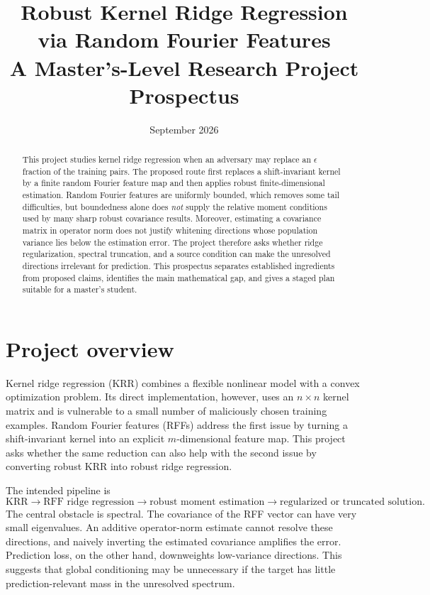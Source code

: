 \documentclass[11pt]{article}
\title{Robust Kernel Ridge Regression via Random Fourier Features\\
\large A Master's-Level Research Project Prospectus}
\author{}
\date{September 2026}
\begin{document}
\maketitle

\begin{abstract}
This project studies kernel ridge regression when an adversary may replace an
$\epsilon$ fraction of the training pairs.  The proposed route first replaces a
shift-invariant kernel by a finite random Fourier feature map and then applies
robust finite-dimensional estimation.  Random Fourier features are uniformly
bounded, which removes some tail difficulties, but boundedness alone does
\emph{not} supply the relative moment conditions used by many sharp robust
covariance results.  Moreover, estimating a covariance matrix in operator norm
does not justify whitening directions whose population variance lies below the
estimation error.  The project therefore asks whether ridge regularization,
spectral truncation, and a source condition can make the unresolved directions
irrelevant for prediction.  This prospectus separates established ingredients
from proposed claims, identifies the main mathematical gap, and gives a staged
plan suitable for a master's student.
\end{abstract}

\tableofcontents

\section{Project overview}

Kernel ridge regression (KRR) combines a flexible nonlinear model with a
convex optimization problem.  Its direct implementation, however, uses an
$n\times n$ kernel matrix and is vulnerable to a small number of maliciously
chosen training examples.  Random Fourier features (RFFs) address the first
issue by turning a shift-invariant kernel into an explicit $m$-dimensional
feature map.  This project asks whether the same reduction can also help with
the second issue by converting robust KRR into robust ridge regression.

The intended pipeline is
\[
 \text{KRR}\longrightarrow \text{RFF ridge regression}
 \longrightarrow \text{robust moment estimation}
 \longrightarrow \text{regularized or truncated solution}.
\]
The central obstacle is spectral.  The covariance of the RFF vector can have
very small eigenvalues.  An additive operator-norm estimate cannot resolve
these directions, and naively inverting the estimated covariance amplifies the
error.  Prediction loss, on the other hand, downweights low-variance
directions.  This suggests that global conditioning may be unnecessary if the
target has little prediction-relevant mass in the unresolved spectrum.
\end{document}
